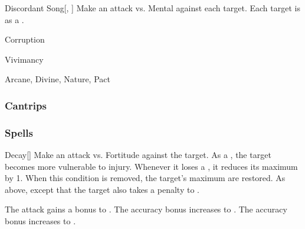 \lowercase{\hypertarget{spell:Discordant Song}{}}\label{spell:Discordant Song}
\begin{freeability}[Rank 7]{\hypertarget{spell:Discordant Song}{Discordant Song}}[, ]
Make an attack vs. Mental against each target.
\hit Each target is \disoriented as a .
\end{freeability}
\vspace{0.25em}


\newpage
\begin{spellsection}{Corruption}

\begin{spellheader}
\end{spellheader}


 Vivimancy

 Arcane, Divine, Nature, Pact

\subsubsection{Cantrips}


\end{spellsection}


\subsubsection{Spells}


\lowercase{\hypertarget{spell:Decay}{}}\label{spell:Decay}
\begin{freeability}[Rank 1]{\hypertarget{spell:Decay}{Decay}}[]
Make an attack vs. Fortitude against the target.
\hit As a , the target becomes more vulnerable to injury.
Whenever it loses a , it reduces its maximum  by 1.
When this condition is removed, the target's maximum  are restored.
\crit As above, except that the target also takes a  penalty to .

\rankline
{} The attack gains a  bonus to .
 The accuracy bonus increases to .
 The accuracy bonus increases to .
\end{freeability}
\vspace{0.25em}



